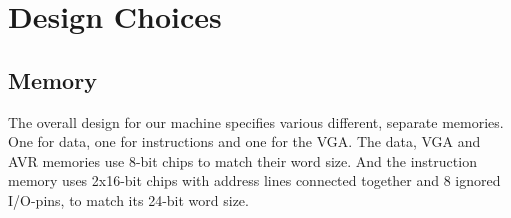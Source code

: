 \section {Design Choices}

\subsection {Memory}
The overall design for our machine specifies various different, separate memories. One for data,
one for instructions and one for the VGA. The data, VGA and AVR memories use 8-bit chips to match
their word size. And the instruction memory uses 2x16-bit chips with address lines connected
together and 8 ignored I/O-pins, to match its 24-bit word size.
\begin{comment}
Tok dette ut siden dette allerede er diskutert tidligere i rapporten
~Mads

One of the
earliest design choices that led to this was the decision to have separate instruction/data-memories.
The reasoning behind this choice being that we could avoid the bottleneck that would be introduced
from sharing memories.
\end{comment}

\begin{comment}
Skrev om for å skille ut prosess
~Mads

Since the requirements for the data/instruction memories differed in both size and word-width 
we wound up with not only separate, but also different chips for this purpose (The data-memory required
8-bit words, the instruction-width was 24-bit, and since we wanted to avoid using multiple memory accesses
to get a complete instruction, we needed a wide enough memory chip for that purpose. 24-bit chips were out of
production, and 32-bit memory was too expensive, thus the solution became 2x16-bit chips with their address lines
connected together and 8 ignored I/O-pins, effectively making them a 24-bit memory).

Since we wanted to reduce the sharing of memories as much as possible, we also needed a separate memory for
our \ac{VGA} controller, as that needed to read it's buffer as fast as possible without interfering with the speed
of the rest of the system. This called for a memory that was big enough to hold at least a full screen-frame,
at 8-bit per pixel (since each pixel is an 8-bit greyscale pixel).

To reduce the possibility of having too slow data-access from the AVR, an extra memory was added to work as
a buffer for the AVR as well. This design choice was made {\em after} ordering, which meant that we had to choose from
the chips we had already ordered to fit this purpose. Since this was intended to carry data intended for the rest
of the system, and as the rest of the system is working with data in 8-bit bytes, we ended up using one of the
extra chips ordered as \ac{VGA} memory for this purpose.

Forresten, da vart det så kort at jeg bare tødde det in i avsnittet over. Må få jobbet prosess-delene inn igjen et eller annet sted!
~Mads
\end{comment}

